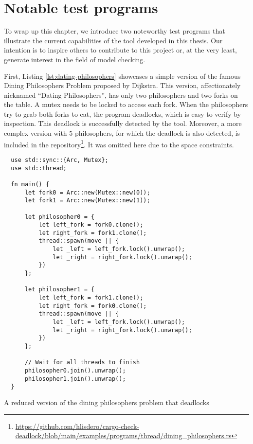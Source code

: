 \section{Notable test programs}

To wrap up this chapter, we introduce two noteworthy test programs that
illustrate the current capabilities of the tool developed in this thesis.
Our intention is to inspire others to contribute to this project or,
at the very least, generate interest in the field of model checking.

First, Listing \ref{lst:dating-philosophers} showcases
a simple version of the famous Dining Philosophers Problem proposed by Dijkstra.
This version, affectionately nicknamed ``Dating Philosophers'',
has only two philosophers and two forks on the table.
A mutex needs to be locked to access each fork.
When the philosophers try to grab both forks to eat, the program deadlocks,
which is easy to verify by inspection.
This deadlock is successfully detected by the tool.
Moreover, a more complex version with 5 philosophers,
for which the deadlock is also detected, is included in the
repository\footnote{\url{https://github.com/hlisdero/cargo-check-deadlock/blob/main/examples/programs/thread/dining\_philosophers.rs}}.
It was omitted here due to the space constraints.

\begin{listing}[!htbp]
    \begin{verbatim}
  use std::sync::{Arc, Mutex};
  use std::thread;
    
  fn main() {
      let fork0 = Arc::new(Mutex::new(0));
      let fork1 = Arc::new(Mutex::new(1));
    
      let philosopher0 = {
          let left_fork = fork0.clone();
          let right_fork = fork1.clone();
          thread::spawn(move || {
              let _left = left_fork.lock().unwrap();
              let _right = right_fork.lock().unwrap();
          })
      };
    
      let philosopher1 = {
          let left_fork = fork1.clone();
          let right_fork = fork0.clone();
          thread::spawn(move || {
              let _left = left_fork.lock().unwrap();
              let _right = right_fork.lock().unwrap();
          })
      };
    
      // Wait for all threads to finish
      philosopher0.join().unwrap();
      philosopher1.join().unwrap();
  }    
  \end{verbatim}
    \caption{A reduced version of the dining philosophers problem that deadlocks}
    \label{lst:dating-philosophers}
\end{listing}


